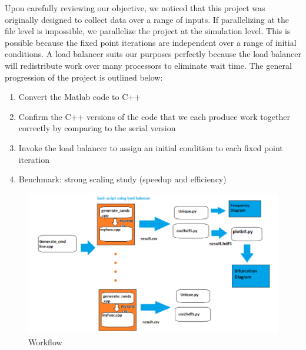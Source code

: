 \documentclass[12pt]{article}
\newcommand{\be}{\begin{enumerate}}
\newcommand{\ee}{\end{enumerate}}
\begin{document}
Upon carefully reviewing our objective, we noticed that this project
was originally designed to collect data over a range of inputs. If
parallelizing at the file level is impossible, we parallelize
the project at the simulation level. This is possible because the
fixed point iterations are independent over a range of initial
conditions. A load balancer suits our purposes perfectly because the
load balancer will redistribute work over many processors to eliminate
wait time. The general progression of the project is outlined below:
\be
\item Convert the Matlab code to C++
\item Confirm the C++ versions of the code that we each produce work
  together correctly by comparing to the serial version
\item Invoke the load balancer to assign an initial condition to each
  fixed point iteration 
\item Benchmark: strong scaling study (speedup and efficiency)
\ee

\begin{figure}[H]
	\begin{center}
		\includegraphics[scale=0.5]{workflow}
\caption{Workflow}\label{workflow}
	\end{center}
\end{figure}
\end{document}
